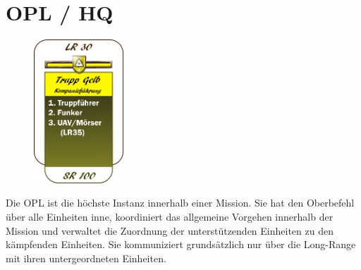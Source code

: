 \section{\acf{OPL} / \acf{HQ}}
\begin{figure}
	\centering 
	\includegraphics[width=0.3\textwidth]{../img/truppenordnung/opl/opl}
\end{figure}	

Die \ac{OPL} ist die höchste Instanz innerhalb einer Mission. Sie hat den Oberbefehl über alle Einheiten inne, koordiniert das allgemeine Vorgehen innerhalb der Mission und verwaltet die Zuordnung der unterstützenden Einheiten zu den kämpfenden Einheiten. Sie kommuniziert grundsätzlich nur über die Long-Range mit ihren untergeordneten Einheiten.\vspace{12pt}\\

